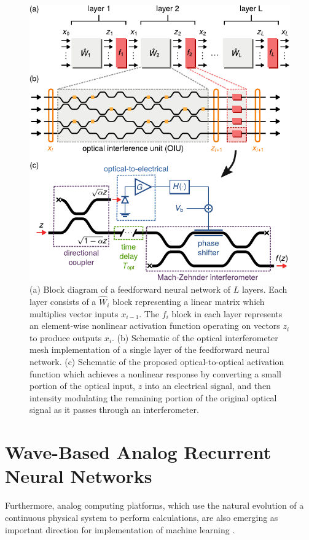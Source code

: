 \begin{figure}
  \centering
  \includegraphics{figures/insitu_activation}
  \caption{(a) Block diagram of a feedforward neural network of $L$ layers. 
  Each layer consists of a $\hat{W}_i$ block representing a linear matrix which multiplies vector inputs $x_{i-1}$. 
  The $f_i$ block in each layer represents an element-wise nonlinear activation function operating on vectors $z_i$ to produce outputs $x_{i}$.
  (b) Schematic of the optical interferometer mesh implementation of a single layer of the feedforward neural network. 
  (c) Schematic of the proposed optical-to-optical activation function which achieves a nonlinear response by converting a small portion of the optical input, $z$ into an electrical signal, and then intensity modulating the remaining portion of the original optical signal as it passes through an interferometer.}
  \label{fig:overview}
\end{figure}


\section{Wave-Based Analog Recurrent Neural Networks}

Furthermore, analog computing platforms, which use the natural evolution of a continuous physical system to perform calculations, are also emerging as important direction for implementation of machine learning \cite{shen_deep_2017, biamonte_quantum_2017, laporte2018numerical, lin2018all, khoram_stochastic_2018}.

